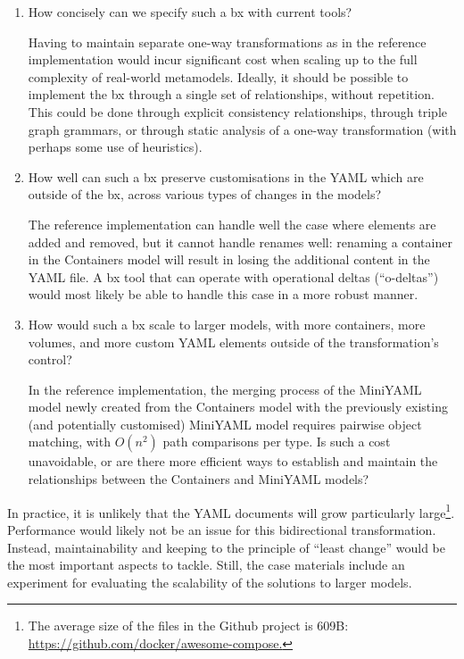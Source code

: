 \documentclass[sigconf,review]{acmart}
\begin{document}
\begin{enumerate}
\item How concisely can we specify such a bx with current tools?

  Having to maintain separate one-way transformations as in the reference
  implementation would incur significant cost when scaling up to the full
  complexity of real-world metamodels. Ideally, it should be possible to
  implement the bx through a single set of relationships, without repetition.
  This could be done through explicit consistency relationships, through triple
  graph grammars, or through static analysis of a one-way transformation (with
  perhaps some use of heuristics).

\item How well can such a bx preserve customisations in the YAML which are
  outside of the bx, across various types of changes in the models?

  The reference implementation can handle well the case where elements are added
  and removed, but it cannot handle renames well: renaming a container in the
  Containers model will result in losing the additional content in the YAML
  file. A bx tool that can operate with operational deltas (``o-deltas'') would
  most likely be able to handle this case in a more robust manner.

\item How would such a bx scale to larger models, with more containers, more
  volumes, and more custom YAML elements outside of the transformation's
  control?

  In the reference implementation, the merging process of the MiniYAML model
  newly created from the Containers model with the previously existing (and
  potentially customised) MiniYAML model requires pairwise object matching, with
  $O(n^2)$ path comparisons per type. Is such a cost unavoidable, or are there
  more efficient ways to establish and maintain the relationships between the
  Containers and MiniYAML models?
\end{enumerate}

In practice, it is unlikely that the YAML documents will grow particularly
large\footnote{The average size of the  files in the
 Github project is 609B:
\url{https://github.com/docker/awesome-compose.}}. Performance would likely not
be an issue for this bidirectional transformation. Instead, maintainability and
keeping to the principle of ``least change'' would be the most important aspects
to tackle. Still, the case materials include an experiment for evaluating the
scalability of the solutions to larger models.
\end{document}
